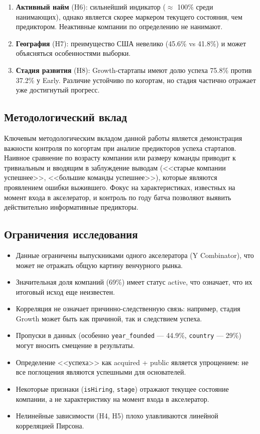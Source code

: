 \begin{enumerate}
    \item \textbf{Активный найм} (H6): сильнейший индикатор ($\approx$ 100\% среди нанимающих), однако является скорее маркером текущего состояния, чем предиктором. Неактивные компании по определению не нанимают.

    \item \textbf{География} (H7): преимущество США невелико (45.6\% vs 41.8\%) и может объясняться особенностями выборки.

    \item \textbf{Стадия развития} (H8): Growth-стартапы имеют долю успеха 75.8\% против 37.2\% у Early. Различие устойчиво по когортам, но стадия частично отражает уже достигнутый прогресс.
\end{enumerate}

\subsection{Методологический вклад}

Ключевым методологическим вкладом данной работы является демонстрация важности контроля по когортам при анализе предикторов успеха стартапов. Наивное сравнение по возрасту компании или размеру команды приводит к тривиальным и вводящим в заблуждение выводам (<<старые компании успешнее>>, <<большие команды успешнее>>), которые являются проявлением ошибки выжившего. Фокус на характеристиках, известных на момент входа в акселератор, и контроль по году батча позволяют выявить действительно информативные предикторы.

\subsection{Ограничения исследования}

\begin{itemize}
    \item Данные ограничены выпускниками одного акселератора (Y Combinator), что может не отражать общую картину венчурного рынка.
    \item Значительная доля компаний (69\%) имеет статус active, что означает, что их итоговый исход еще неизвестен.
    \item Корреляция не означает причинно-следственную связь: например, стадия Growth может быть как причиной, так и следствием успеха.
    \item Пропуски в данных (особенно \texttt{year\_founded} --- 44.9\%, \texttt{country} --- 29\%) могут вносить смещение в результаты.
    \item Определение <<успеха>> как acquired + public является упрощением: не все поглощения являются успешными для основателей.
    \item Некоторые признаки (\texttt{isHiring}, \texttt{stage}) отражают текущее состояние компании, а не характеристику на момент входа в акселератор.
    \item Нелинейные зависимости (H4, H5) плохо улавливаются линейной корреляцией Пирсона.
\end{itemize}

